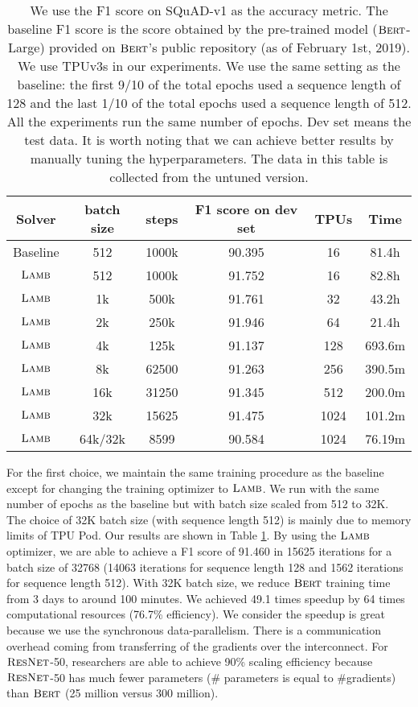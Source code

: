 \documentclass{article} \usepackage{iclr2020_conference,times}
\newcommand{\resnet}{\textsc{ResNet}}
\newcommand{\bert}{\textsc{Bert}\xspace}
\newcommand{\lamb}{\textsc{Lamb}}
\begin{document}
\begin{table}[ht]
\renewcommand{\arraystretch}{1.3}
\caption{ We use the F1 score on SQuAD-v1 as the accuracy metric. The baseline F1 score is the score obtained by the pre-trained model ($\bert$-Large) provided on $\bert$'s public repository (as of February 1st, 2019). We use TPUv3s in our experiments. We use the same setting as the baseline: the first 9/10 of the total epochs used a sequence length of 128 and the last 1/10 of the total epochs used a sequence length of 512. All the experiments run the same number of epochs. Dev set means the test data. It is worth noting that we can achieve better results by manually tuning the hyperparameters. The data in this table is collected from the untuned version.}
\centering
 
\begin{tabular}{|c|c|c|c|c|c|}
\hline
Solver & batch size & steps & F1 score on dev set & TPUs & Time\\
\hline
\hline
Baseline & 512 & 1000k & 90.395 & 16 & 81.4h\\
\hline
$\lamb$ & 512 & 1000k & 91.752 & 16 & 82.8h\\
\hline
$\lamb$ & 1k & 500k & 91.761 & 32 & 43.2h\\
\hline
$\lamb$ & 2k & 250k & 91.946 & 64 & 21.4h\\
\hline
$\lamb$ & 4k & 125k & 91.137 & 128 & 693.6m\\
\hline
$\lamb$ & 8k & 62500 & 91.263 & 256 & 390.5m\\
\hline
$\lamb$ & 16k & 31250 & 91.345 & 512 & 200.0m\\
\hline
$\lamb$ & 32k & 15625 & 91.475 & 1024 & 101.2m\\
\hline
\hline
$\lamb$ & 64k/32k & 8599 & 90.584 & 1024 & 76.19m\\
\hline
\end{tabular}
\label{table:results}
\end{table}










For the first choice, we maintain the same training procedure as the baseline except for changing the training optimizer to $\lamb$. We run with the same number of epochs as the baseline but with batch size scaled from 512 to 32K. The choice of 32K batch size (with sequence length 512) is mainly due to memory limits of TPU Pod. Our results are shown in Table \ref{table:results}. By using the $\lamb$ optimizer, we are able to achieve a F1 score of 91.460 in 15625 iterations for a batch size of 32768 (14063 iterations for sequence length 128 and 1562 iterations for sequence length 512).
With 32K batch size, we reduce $\bert$ training time from 3 days to around 100 minutes. 
We achieved 49.1 times speedup by 64 times computational resources (76.7\% efficiency).
We consider the speedup is great because we use the synchronous data-parallelism. 
There is a communication overhead coming from transferring of the gradients over the interconnect.
For $\resnet$-50, researchers are able to achieve 90\% scaling efficiency because $\resnet$-50 has much fewer parameters (\# parameters is equal to \#gradients) than $\bert$ (25 million versus 300 million).
\end{document}

